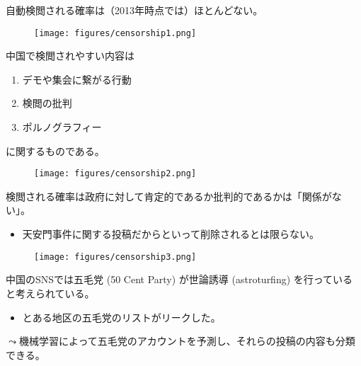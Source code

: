 \documentclass[
  xelatex,
  ja=standard]{bxjsarticle}
\providecommand{\tightlist}{%
  \setlength{\itemsep}{0pt}\setlength{\parskip}{0pt}}\usepackage{longtable,booktabs,array}
\begin{document}
自動検閲される確率は（2013年時点では）ほとんどない。

\begin{figure}[htpb]

{\centering \texttt{[image: figures/censorship1.png]}

}

\caption{\citet{king2014}}

\end{figure}

中国で検閲されやすい内容は

\begin{enumerate}
\def\labelenumi{\arabic{enumi}.}
\tightlist
\item
  デモや集会に繋がる行動
\item
  検閲の批判
\item
  ポルノグラフィー
\end{enumerate}

に関するものである。

\begin{figure}[htpb]

{\centering \texttt{[image: figures/censorship2.png]}

}

\caption{\citet{king2013}}

\end{figure}

検閲される確率は政府に対して肯定的であるか批判的であるかは「関係がない」。

\begin{itemize}
\tightlist
\item
  天安門事件に関する投稿だからといって削除されるとは限らない。
\end{itemize}

\begin{figure}[htpb]

{\centering \texttt{[image: figures/censorship3.png]}

}

\caption{\citet{king2013}}

\end{figure}

中国のSNSでは五毛党 (50 Cent Party) が世論誘導 (astroturfing)
を行っていると考えられている。

\begin{itemize}
\tightlist
\item
  とある地区の五毛党のリストがリークした。
\end{itemize}

\(\leadsto\)機械学習によって五毛党のアカウントを予測し、それらの投稿の内容も分類できる。
\end{document}

